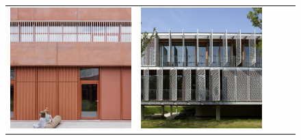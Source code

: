 \begin{figure}[H]
{\begin{tabular}{@{}ccccc@{}}
      \includegraphics[width=\linewidth]{Images/LoRAs/Modulariteit/Training_images/11.jpg} &
      \includegraphics[width=\linewidth]{Images/LoRAs/Modulariteit/Training_images/12.jpg} &

\end{tabular}}
\end{figure}
